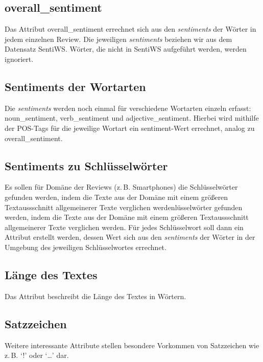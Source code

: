 \documentclass[a4paper]{article}
\newcommand{\ourhighlight}[1]{\textit{#1}}
\begin{document}
\subsection{overall\_sentiment}
Das Attribut overall\_sentiment errechnet sich aus den \ourhighlight{sentiments} der Wörter in jedem einzelnen Review.
Die jeweiligen \ourhighlight{sentiments} beziehen wir aus dem Datensatz SentiWS. Wörter, die nicht in SentiWS aufgeführt werden, werden ignoriert.


\subsection{Sentiments der Wortarten}
Die \ourhighlight{sentiments} werden noch einmal für verschiedene Wortarten einzeln erfasst: noun\_sentiment, verb\_sentiment und adjective\_sentiment.
Hierbei wird mithilfe der POS-Tags für die jeweilige Wortart ein sentiment-Wert errechnet, analog zu overall\_sentiment.


\subsection{Sentiments zu Schlüsselwörter}
Es sollen für Domäne der Reviews (z.\,B. Smartphones) die Schlüsselwörter gefunden werden, indem die Texte aus der Domäne mit einem größeren Textaussschnitt allgemeinerer Texte verglichen werdenlüsselwörter gefunden werden, indem die Texte aus der Domäne mit einem größeren Textaussschnitt allgemeinerer Texte verglichen werden.
Für jedes Schlüsselwort soll dann ein Attribut erstellt werden, dessen Wert sich aus den \ourhighlight{sentiments} der Wörter in der Umgebung des jeweiligen Schlüsselwortes errechnet.


\subsection{Länge des Textes}
Das Attribut beschreibt die Länge des Textes in Wörtern.


\subsection{Satzzeichen}
Weitere interessante Attribute stellen besondere Vorkommen von Satzzeichen wie z.\,B. `!' oder `\ldots' dar.
\end{document}
